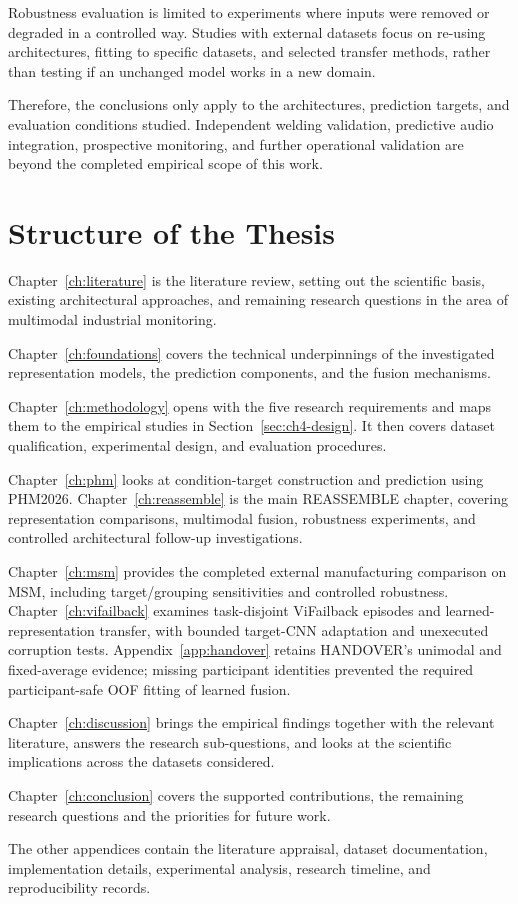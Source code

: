 Robustness evaluation is limited to experiments where inputs
were removed or degraded in a controlled way. Studies with
external datasets focus on re-using architectures, fitting to
specific datasets, and selected transfer methods, rather than
testing if an unchanged model works in a new domain.

Therefore, the conclusions only apply to the architectures,
prediction targets, and evaluation conditions studied. Independent
welding validation, predictive audio integration, prospective
monitoring, and further operational validation are beyond the
completed empirical scope of this work.



\section{Structure of the Thesis}

Chapter~\ref{ch:literature} is the literature review, setting out the scientific
basis, existing architectural approaches, and remaining research
questions in the area of multimodal industrial monitoring.

Chapter~\ref{ch:foundations} covers the technical underpinnings of the investigated
representation models, the prediction components, and the fusion
mechanisms.

Chapter~\ref{ch:methodology} opens with the five research requirements and maps
them to the empirical studies in Section~\ref{sec:ch4-design}. It then covers
dataset qualification, experimental design, and evaluation procedures.

Chapter~\ref{ch:phm} looks at condition-target construction and prediction
using PHM2026. Chapter~\ref{ch:reassemble} is the main REASSEMBLE chapter, covering
representation comparisons, multimodal fusion, robustness
experiments, and controlled architectural follow-up investigations.

Chapter~\ref{ch:msm} provides the completed external manufacturing comparison on MSM, including
target/grouping sensitivities and controlled robustness. Chapter~\ref{ch:vifailback} examines task-disjoint
ViFailback episodes and learned-representation transfer, with bounded target-CNN
adaptation and unexecuted corruption tests. Appendix~\ref{app:handover} retains HANDOVER's
unimodal and fixed-average evidence; missing participant identities prevented the
required participant-safe OOF fitting of learned fusion.

Chapter~\ref{ch:discussion} brings the empirical findings together
with the relevant literature, answers the research sub-questions,
and looks at the scientific implications across the datasets
considered.

Chapter~\ref{ch:conclusion} covers the supported contributions,
the remaining research questions and the priorities for future work.

The other appendices contain the literature appraisal, dataset
documentation, implementation details, experimental analysis,
research timeline, and reproducibility records.
